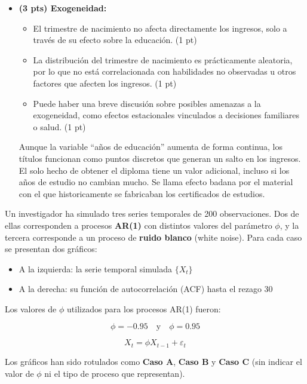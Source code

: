 \documentclass[10pt,a4paper]{article}
\begin{document}
\begin{enumerate}
{{{{{\begin{itemize}
        \item \textbf{(3 pts) Exogeneidad:}
        \begin{itemize}
            \item El trimestre de nacimiento no afecta directamente los ingresos, solo a través de su efecto sobre la educación. \hfill (1 pt)
            \item La distribución del trimestre de nacimiento es prácticamente aleatoria, por lo que no está correlacionada con habilidades no observadas u otros factores que afecten los ingresos. \hfill (1 pt)
            \item Puede haber una breve discusión sobre posibles amenazas a la exogeneidad, como efectos estacionales vinculados a decisiones familiares o salud. \hfill (1 pt)
        \end{itemize}

     Aunque la variable “años de educación” aumenta de forma continua, los títulos funcionan como puntos discretos que generan un salto en los ingresos.
El solo hecho de obtener el diploma tiene un valor adicional, incluso si los años de estudio no cambian mucho.   Se llama efecto badana por el material con el que historicamente se fabricaban los certificados de estudios.
    \end{itemize}
   }

 \item Un investigador ha simulado tres series temporales de 200 observaciones. Dos de ellas corresponden a procesos \textbf{AR(1)} con distintos valores del parámetro \( \phi \), y la tercera corresponde a un proceso de \textbf{ruido blanco} (white noise). Para cada caso se presentan dos gráficos:

\begin{itemize}
    \item A la izquierda: la serie temporal simulada \( \{X_t\} \)
    \item A la derecha: su función de autocorrelación (ACF) hasta el rezago 30
\end{itemize}

Los valores de \( \phi \) utilizados para los procesos AR(1) fueron:

\[
\phi = -0.95 \quad \text{y} \quad \phi = 0.95
\]

\[
X_t = \phi X_{t-1} + \varepsilon_t
\]

Los gráficos han sido rotulados como \textbf{Caso A}, \textbf{Caso B} y \textbf{Caso C} (sin indicar el valor de \( \phi \) ni el tipo de proceso que representan).

}}}}
\end{enumerate}
\end{document}
